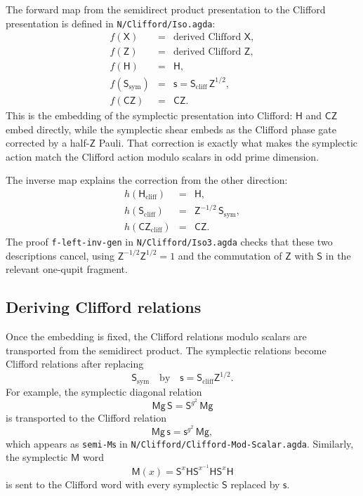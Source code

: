 \documentclass[a4paper,11pt]{article}
\newcommand{\xto}{\mathsf X}
\newcommand{\zto}{\mathsf Z}
\newcommand{\sGate}{\mathsf S}
\newcommand{\hGate}{\mathsf H}
\newcommand{\czGate}{\mathsf {CZ}}
\newcommand{\mg}{\mathsf {Mg}}
\newcommand{\mGate}{\mathsf M}
\newcommand{\code}[1]{\texttt{#1}}
\begin{document}
The forward map from the semidirect product presentation to the
Clifford presentation is defined in \code{N/Clifford/Iso.agda}:
\[
\begin{array}{rcl}
f(\xto) &=& \text{derived Clifford }\xto,\\
f(\zto) &=& \text{derived Clifford }\zto,\\
f(\hGate) &=& \hGate,\\
f(\sGate_{\mathrm{sym}}) &=& \mathsf{s}
      = \sGate_{\mathrm{cliff}}\,\zto^{1/2},\\
f(\czGate) &=& \czGate .
\end{array}
\]
This is the embedding of the symplectic presentation into Clifford:
$\hGate$ and $\czGate$ embed directly, while the symplectic shear
embeds as the Clifford phase gate corrected by a half-$\zto$ Pauli.
That correction is exactly what makes the symplectic action match the
Clifford action modulo scalars in odd prime dimension.

The inverse map explains the correction from the other direction:
\[
\begin{array}{rcl}
h(\hGate_{\mathrm{cliff}}) &=& \hGate,\\
h(\sGate_{\mathrm{cliff}}) &=& \zto^{-1/2}\,\sGate_{\mathrm{sym}},\\
h(\czGate_{\mathrm{cliff}}) &=& \czGate .
\end{array}
\]
The proof \code{f-left-inv-gen} in \code{N/Clifford/Iso3.agda}
checks that these two descriptions cancel, using
$\zto^{-1/2}\zto^{1/2}=1$ and the commutation of $\zto$ with
$\sGate$ in the relevant one-qupit fragment.

\subsection{Deriving Clifford relations}

Once the embedding is fixed, the Clifford relations modulo scalars are
transported from the semidirect product.  The symplectic relations
become Clifford relations after replacing
\[
  \sGate_{\mathrm{sym}}
  \quad\text{by}\quad
  \mathsf{s}=\sGate_{\mathrm{cliff}}\zto^{1/2}.
\]
For example, the symplectic diagonal relation
\[
  \mg\,\sGate = \sGate^{g^2}\,\mg
\]
is transported to the Clifford relation
\[
  \mg\,\mathsf{s} = \mathsf{s}^{g^2}\,\mg,
\]
which appears as \code{semi-M}\ensuremath{\mathsf{s}} in
\code{N/Clifford/Clifford-Mod-Scalar.agda}.  Similarly, the
symplectic $\mGate$ word
\[
  \mGate(x)=\sGate^x\hGate\sGate^{x^{-1}}\hGate\sGate^x\hGate
\]
is sent to the Clifford word with every symplectic $\sGate$ replaced
by $\mathsf{s}$.
\end{document}
